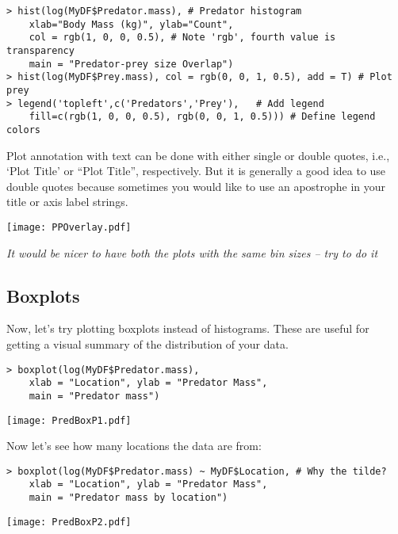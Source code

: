 \begin{lstlisting}
> hist(log(MyDF$Predator.mass), # Predator histogram
    xlab="Body Mass (kg)", ylab="Count", 
    col = rgb(1, 0, 0, 0.5), # Note 'rgb', fourth value is transparency
    main = "Predator-prey size Overlap") 
> hist(log(MyDF$Prey.mass), col = rgb(0, 0, 1, 0.5), add = T) # Plot prey
> legend('topleft',c('Predators','Prey'),   # Add legend
    fill=c(rgb(1, 0, 0, 0.5), rgb(0, 0, 1, 0.5))) # Define legend colors
\end{lstlisting}

\begin{tipbox}
	Plot annotation with text can be done with either single or double 
	quotes, i.e., `Plot Title' or ``Plot Title'', respectively. But it is generally a 
	good idea to use double quotes because sometimes you would like to 
	use an apostrophe in your title or axis label strings.   
\end{tipbox}

\begin{center}
   \texttt{[image: PPOverlay.pdf]} 
\end{center}

{\it It would be nicer to have both the plots with the same bin sizes 
-- try to do it}

\subsection{Boxplots}
Now, let's try plotting boxplots instead of  histograms. These are 
useful for getting a visual summary of the distribution of your data. 

\begin{lstlisting}
> boxplot(log(MyDF$Predator.mass),
	xlab = "Location", ylab = "Predator Mass",
	main = "Predator mass")
\end{lstlisting}
\begin{center}
   \texttt{[image: PredBoxP1.pdf]} 
\end{center}

Now let's see how many locations the data are from: 
\begin{lstlisting}
> boxplot(log(MyDF$Predator.mass) ~ MyDF$Location, # Why the tilde?
	xlab = "Location", ylab = "Predator Mass",
	main = "Predator mass by location")
\end{lstlisting}
\begin{center}
   \texttt{[image: PredBoxP2.pdf]} 
\end{center}

